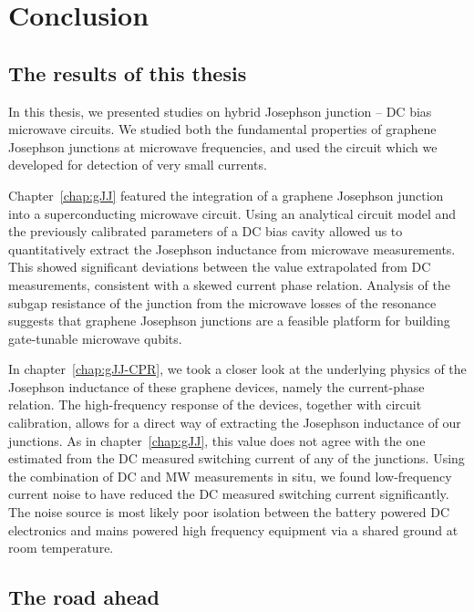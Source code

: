 \newchapstyle
\chapter{Conclusion}
\label{chap:conclusion}

\afterpage{\pagecolor{none}}\newpage

\section{The results of this thesis}
In this thesis, we presented studies on hybrid Josephson junction -- DC bias microwave circuits.
%
We studied both the fundamental properties of graphene Josephson junctions at microwave frequencies, and used the circuit which we developed for detection of very small currents.

Chapter~\ref{chap:gJJ} featured the integration of a graphene Josephson junction into a superconducting microwave circuit.
%
Using an analytical circuit model and the previously calibrated parameters of a DC bias cavity allowed us to quantitatively extract the Josephson inductance from microwave measurements.
%
This showed significant deviations between the value extrapolated from DC measurements, consistent with a skewed current phase relation.
%
Analysis of the subgap resistance of the junction from the microwave losses of the resonance suggests that graphene Josephson junctions are a feasible platform for building gate-tunable microwave qubits.

In chapter~\ref{chap:gJJ-CPR}, we took a closer look at the underlying physics of the Josephson inductance of these graphene devices, namely the current-phase relation.
%
The high-frequency response of the devices, together with circuit calibration, allows for a direct way of extracting the Josephson inductance of our junctions.
%
As in chapter~\ref{chap:gJJ}, this value does not agree with the one estimated from the DC measured switching current of any of the junctions.
%
Using the combination of DC and MW measurements in situ, we found low-frequency current noise to have reduced the DC measured switching current significantly.
%
The noise source is most likely poor isolation between the battery powered DC electronics and mains powered high frequency equipment via a shared ground at room temperature.
%

\section{The road ahead}

